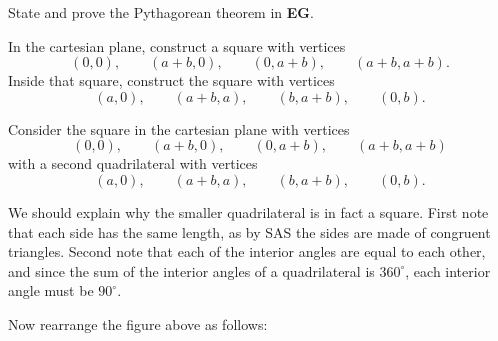 \documentclass[newpage,hints,handout]{ximera}
\begin{document}
\begin{problem}
State and prove the Pythagorean theorem in \textbf{EG}.

\begin{hint}
In the cartesian plane, construct a square with vertices
\[
\left(0,0\right),\qquad \left(a+b,0\right),\qquad \left(0,a+b\right), \qquad \left( a+b,a+b\right).
\] 
Inside that square, construct the square with vertices 
\[
\left(a,0\right),\qquad \left(a+b,a\right),\qquad \left(b,a+b\right), \qquad \left(0,b\right).
\]
\end{hint}
\begin{freeResponse}
Consider the square in the cartesian plane with vertices
\[
\left(0,0\right),\qquad \left(a+b,0\right),\qquad \left(0,a+b\right),
\qquad \left( a+b,a+b\right)
\]
with a second quadrilateral with vertices
\[
\left(a,0\right),\qquad \left(a+b,a\right),\qquad \left(b,a+b\right), \qquad \left(0,b\right).
\]
\begin{image}
\end{image}
We should explain why the smaller quadrilateral is in fact a
square. First note that each side has the same length, as by SAS the
sides are made of congruent triangles. Second note that each of the
interior angles are equal to each other, and since the sum of the
interior angles of a quadrilateral is $360^\circ$, each interior angle
must be $90^\circ$.

Now rearrange the figure above as follows:
\begin{image}
\end{image}
\end{freeResponse}
\end{problem}
\end{document}
